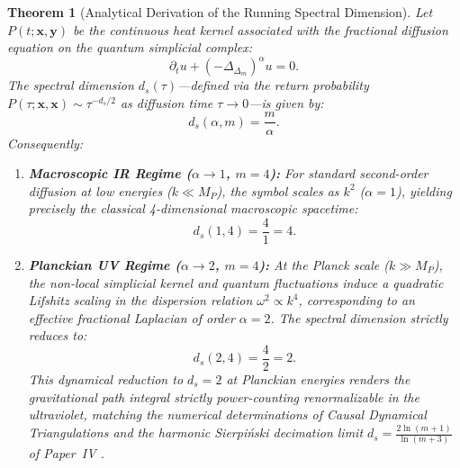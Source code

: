\documentclass[11pt,a4paper,reqno]{amsart}
\newtheorem{theorem}{Theorem}[section]
\theoremstyle{definition}
\numberwithin{equation}{section}
\begin{document}
\begin{theorem}[Analytical Derivation of the Running Spectral Dimension]
\label{thm:running_spectral_dimension}
Let $P(t; \mathbf{x}, \mathbf{y})$ be the continuous heat kernel associated with the fractional diffusion equation on the quantum simplicial complex:
\begin{equation}
    \partial_t u + (-\Delta_{\Delta_m})^\alpha u = 0.
\end{equation}
The spectral dimension $d_s(\tau)$—defined via the return probability $P(\tau; \mathbf{x}, \mathbf{x}) \sim \tau^{-d_s/2}$ as diffusion time $\tau \to 0$—is given by:
\begin{equation}
    \label{eq:spectral_dimension_formula}
    d_s(\alpha, m) = \frac{m}{\alpha}.
\end{equation}
Consequently:
\begin{enumerate}[label=(\roman*)]
    \item \textbf{Macroscopic IR Regime ($\alpha \to 1$, $m = 4$):} For standard second-order diffusion at low energies ($k \ll M_P$), the symbol scales as $k^2$ ($\alpha = 1$), yielding precisely the classical 4-dimensional macroscopic spacetime:
    \begin{equation}
        d_s(1, 4) = \frac{4}{1} = 4.
    \end{equation}
    \item \textbf{Planckian UV Regime ($\alpha \to 2$, $m = 4$):} At the Planck scale ($k \gg M_P$), the non-local simplicial kernel and quantum fluctuations induce a quadratic Lifshitz scaling in the dispersion relation $\omega^2 \propto k^4$, corresponding to an effective fractional Laplacian of order $\alpha = 2$. The spectral dimension strictly reduces to:
    \begin{equation}
        d_s(2, 4) = \frac{4}{2} = 2.
    \end{equation}
    This dynamical reduction to $d_s = 2$ at Planckian energies renders the gravitational path integral strictly power-counting renormalizable in the ultraviolet, matching the numerical determinations of Causal Dynamical Triangulations \cite{ambjorn2005spectral} and the harmonic Sierpi\'nski decimation limit $d_s = \frac{2\ln(m+1)}{\ln(m+3)}$ of Paper~IV \cite{silvafilho2026pascal}.
\end{enumerate}
\end{theorem}
\end{document}
